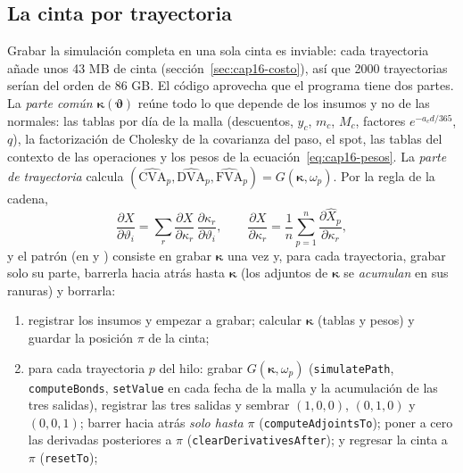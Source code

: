 \begin{sloppypar}
\subsection{La cinta por trayectoria}\label{sec:cap16-cinta}

Grabar la simulación completa en una sola cinta es inviable: cada trayectoria añade unos 43 MB de cinta
(sección~\ref{sec:cap16-costo}), así que 2000 trayectorias serían del orden de 86 GB. El código aprovecha que el
programa tiene dos partes. La \emph{parte común} $\boldsymbol\kappa(\boldsymbol\vartheta)$ reúne todo lo que depende
de los insumos y no de las normales: las tablas por día de la malla (descuentos, $y_c$, $m_c$, $M_c$, factores
$e^{-a_c d/365}$, $q$), la factorización de Cholesky de la covarianza del paso, el spot, las tablas del contexto de
las operaciones y los pesos de la ecuación~\eqref{eq:cap16-pesos}. La \emph{parte de trayectoria} calcula
$(\widehat{\mathrm{CVA}}_p,\widehat{\mathrm{DVA}}_p,\widehat{\mathrm{FVA}}_p)=G(\boldsymbol\kappa,\omega_p)$. Por la regla de la cadena,
\begin{equation}\label{eq:cap16-parte-comun}
  \frac{\partial X}{\partial\vartheta_i}=\sum_r\frac{\partial X}{\partial\kappa_r}\,\frac{\partial\kappa_r}{\partial\vartheta_i},\qquad
  \frac{\partial X}{\partial\kappa_r}=\frac1n\sum_{p=1}^{n}\frac{\partial\widehat X_p}{\partial\kappa_r},
\end{equation}
y el patrón (en  y ) consiste en grabar $\boldsymbol\kappa$ una vez y, para cada trayectoria, grabar solo su parte, barrerla hacia
atrás hasta $\boldsymbol\kappa$ (los adjuntos de $\boldsymbol\kappa$ se \emph{acumulan} en sus ranuras) y borrarla:
\begin{enumerate}
  \item registrar los insumos y empezar a grabar; calcular $\boldsymbol\kappa$ (tablas y pesos) y guardar la posición $\pi$ de la cinta;
  \item para cada trayectoria $p$ del hilo: grabar $G(\boldsymbol\kappa,\omega_p)$ (\texttt{simulatePath}, \texttt{computeBonds},
        \texttt{setValue} en cada fecha de la malla y la acumulación de las tres salidas), registrar las tres salidas y
        sembrar $(1,0,0)$, $(0,1,0)$ y $(0,0,1)$; barrer hacia atrás \emph{solo hasta $\pi$}
        (\texttt{computeAdjointsTo}); poner a cero las derivadas posteriores a $\pi$ (\texttt{clearDerivativesAfter}); y
        regresar la cinta a $\pi$ (\texttt{resetTo});

\end{enumerate}
\end{sloppypar}
